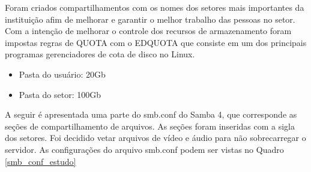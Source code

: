 Foram criados compartilhamentos com os nomes dos setores mais importantes da instituição afim de melhorar e garantir o melhor trabalho das pessoas no setor. Com a intenção de melhorar o controle dos recursos de armazenamento foram impostas regras de QUOTA com o EDQUOTA que consiste em um dos principais programas gerenciadores de cota de disco no Linux.

\begin{itemize}
		\item {Pasta do usuário: 20Gb}
		\item {Pasta do setor: 100Gb}
\end{itemize}

A seguir é apresentada uma parte do smb.conf do Samba 4, que corresponde as seções de compartilhamento de arquivos. As seções foram inseridas com a sigla dos setores. Foi decidido vetar arquivos de vídeo e áudio para não sobrecarregar o servidor. As configurações do arquivo smb.conf podem ser vistas no Quadro \ref{smb_conf_estudo}\\

